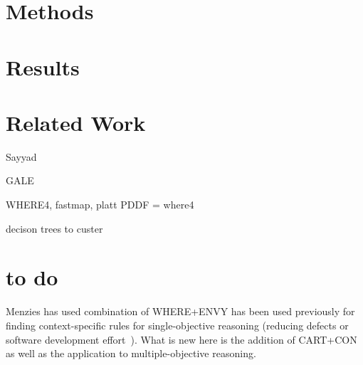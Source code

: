 \documentclass[runningheads]{llncs}
\begin{document}
\section{Methods}

\section{Results}



\section{Related Work}

Sayyad

GALE

WHERE4, fastmap, platt
PDDF = where4

decison trees to custer

\section{to do}

Menzies has used combination of WHERE+ENVY has been
used previously for finding context-specific rules
for single-objective reasoning (reducing defects or
software development effort~\cite{me12d}).  What is
new here is the addition of CART+CON as well as the
application to multiple-objective reasoning.

{\scriptsize



}
\end{document}
